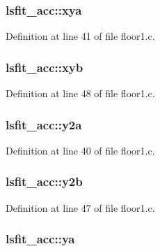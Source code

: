 \subsubsection[{\texorpdfstring{xya}{xya}}]{ lsfit\+\_\+acc\+::xya}\hypertarget{structlsfit__acc_a7479d7df5f1f76eb38f020598dc347ed}{}\label{structlsfit__acc_a7479d7df5f1f76eb38f020598dc347ed}


Definition at line 41 of file floor1.\+c.

\subsubsection[{\texorpdfstring{xyb}{xyb}}]{ lsfit\+\_\+acc\+::xyb}\hypertarget{structlsfit__acc_ab9e3ed10bb6252ede78e5514496391b4}{}\label{structlsfit__acc_ab9e3ed10bb6252ede78e5514496391b4}


Definition at line 48 of file floor1.\+c.

\subsubsection[{\texorpdfstring{y2a}{y2a}}]{ lsfit\+\_\+acc\+::y2a}\hypertarget{structlsfit__acc_ae6408438922bd96bfc0008fee1e2f43c}{}\label{structlsfit__acc_ae6408438922bd96bfc0008fee1e2f43c}


Definition at line 40 of file floor1.\+c.

\subsubsection[{\texorpdfstring{y2b}{y2b}}]{ lsfit\+\_\+acc\+::y2b}\hypertarget{structlsfit__acc_af8c258fca96de2da6190dd82b1a9e66e}{}\label{structlsfit__acc_af8c258fca96de2da6190dd82b1a9e66e}


Definition at line 47 of file floor1.\+c.

\subsubsection[{\texorpdfstring{ya}{ya}}]{ lsfit\+\_\+acc\+::ya}\hypertarget{structlsfit__acc_a26e05cb633bf0845ad123ca3bf432061}{}\label{structlsfit__acc_a26e05cb633bf0845ad123ca3bf432061}


